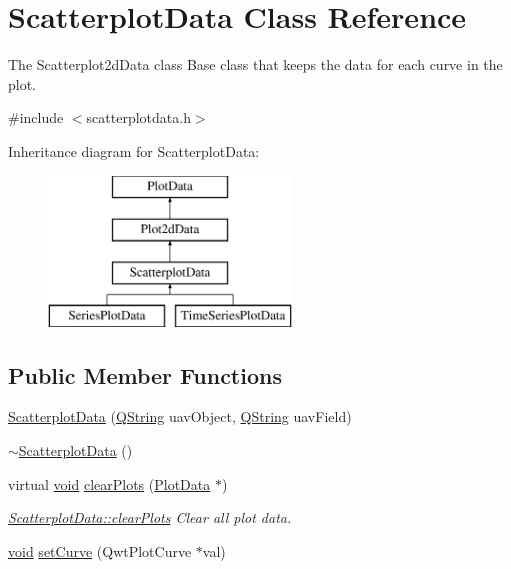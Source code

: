 \hypertarget{class_scatterplot_data}{\section{\-Scatterplot\-Data \-Class \-Reference}
\label{class_scatterplot_data}
}


\-The \-Scatterplot2d\-Data class \-Base class that keeps the data for each curve in the plot.  




{\ttfamily \#include $<$scatterplotdata.\-h$>$}

\-Inheritance diagram for \-Scatterplot\-Data\-:\begin{figure}[H]
\begin{center}
\leavevmode
\includegraphics[height=4.000000cm]{class_scatterplot_data}
\end{center}
\end{figure}
\subsection*{\-Public \-Member \-Functions}
\begin{DoxyCompactItemize}
\item 
\hyperlink{group___scope_plugin_ga1e171be371a5e44f814dc012e182f99b}{\-Scatterplot\-Data} (\hyperlink{group___u_a_v_objects_plugin_gab9d252f49c333c94a72f97ce3105a32d}{\-Q\-String} uav\-Object, \hyperlink{group___u_a_v_objects_plugin_gab9d252f49c333c94a72f97ce3105a32d}{\-Q\-String} uav\-Field)
\item 
\hyperlink{group___scope_plugin_gacbf85488507f5abc08a2e018fe01c6aa}{$\sim$\-Scatterplot\-Data} ()
\item 
virtual \hyperlink{group___u_a_v_objects_plugin_ga444cf2ff3f0ecbe028adce838d373f5c}{void} \hyperlink{group___scope_plugin_gaa7f91ef4cdbbbdc7e767c24bfea06159}{clear\-Plots} (\hyperlink{class_plot_data}{\-Plot\-Data} $\ast$)
\begin{DoxyCompactList}\small\item\em \hyperlink{group___scope_plugin_gaa7f91ef4cdbbbdc7e767c24bfea06159}{\-Scatterplot\-Data\-::clear\-Plots} \-Clear all plot data. \end{DoxyCompactList}\item 
\hyperlink{group___u_a_v_objects_plugin_ga444cf2ff3f0ecbe028adce838d373f5c}{void} \hyperlink{group___scope_plugin_gac306ab453dd4daa43ebd0565b7f73783}{set\-Curve} (\-Qwt\-Plot\-Curve $\ast$val)
\end{DoxyCompactItemize}
